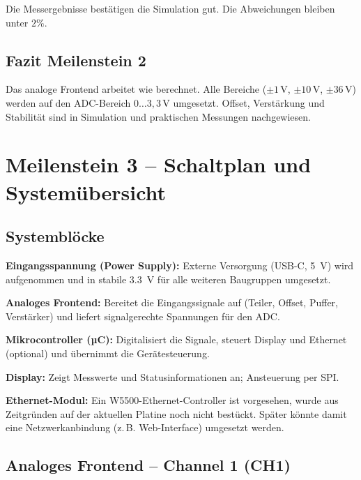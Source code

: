 \documentclass{article}
\begin{document}
	Die Messergebnisse bestätigen die Simulation gut.  
	Die Abweichungen bleiben unter \(2\%\).
	
	\subsection{Fazit Meilenstein 2}
	
	Das analoge Frontend arbeitet wie berechnet.  
	Alle Bereiche (\(\pm1\,\mathrm{V}\), \(\pm10\,\mathrm{V}\), \(\pm36\,\mathrm{V}\)) werden auf den ADC-Bereich \(0\dots3{,}3\,\mathrm{V}\) umgesetzt.  
	Offset, Verstärkung und Stabilität sind in Simulation und praktischen Messungen nachgewiesen.
	
	\newpage
	
	\section{Meilenstein 3 – Schaltplan und Systemübersicht}
	
	
	
	
	\subsection{Systemblöcke}
	
	\textbf{Eingangsspannung (Power Supply):}  
	Externe Versorgung (USB-C, \SI{5}{V}) wird aufgenommen und in stabile \SI{3.3}{V}
	für alle weiteren Baugruppen umgesetzt.
	
	\textbf{Analoges Frontend:}  
	Bereitet die Eingangssignale auf (Teiler, Offset, Puffer, Verstärker) und liefert
	signalgerechte Spannungen für den ADC.
	
	\textbf{Mikrocontroller (µC):}  
	Digitalisiert die Signale, steuert Display und Ethernet (optional) und übernimmt die Gerätesteuerung.
	
	\textbf{Display:}  
	Zeigt Messwerte und Statusinformationen an; Ansteuerung per SPI.
	
	\textbf{Ethernet-Modul:}  
	Ein W5500-Ethernet-Controller ist vorgesehen, wurde aus Zeitgründen auf der aktuellen Platine
	noch nicht bestückt. Später könnte damit eine Netzwerkanbindung (z.\,B. Web-Interface) umgesetzt werden.
	
	\subsection{Analoges Frontend – Channel 1 (CH1)}
	
\end{document}
